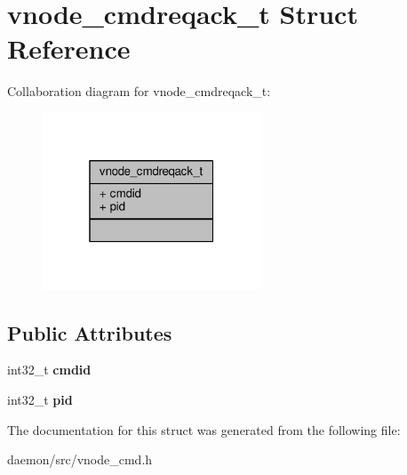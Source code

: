\hypertarget{structvnode__cmdreqack__t}{\section{vnode\+\_\+cmdreqack\+\_\+t Struct Reference}
\label{structvnode__cmdreqack__t}
}


Collaboration diagram for vnode\+\_\+cmdreqack\+\_\+t\+:
\nopagebreak
\begin{figure}[H]
\begin{center}
\leavevmode
\includegraphics[width=184pt]{structvnode__cmdreqack__t__coll__graph}
\end{center}
\end{figure}
\subsection*{Public Attributes}
\begin{DoxyCompactItemize}
\item 
\hypertarget{structvnode__cmdreqack__t_a09dfe7402111ac68f803dec1c7957d95}{int32\+\_\+t {\bfseries cmdid}}\label{structvnode__cmdreqack__t_a09dfe7402111ac68f803dec1c7957d95}

\item 
\hypertarget{structvnode__cmdreqack__t_ab1255050937f89859155045e013879dc}{int32\+\_\+t {\bfseries pid}}\label{structvnode__cmdreqack__t_ab1255050937f89859155045e013879dc}

\end{DoxyCompactItemize}


The documentation for this struct was generated from the following file\+:\begin{DoxyCompactItemize}
\item 
daemon/src/vnode\+\_\+cmd.\+h\end{DoxyCompactItemize}
